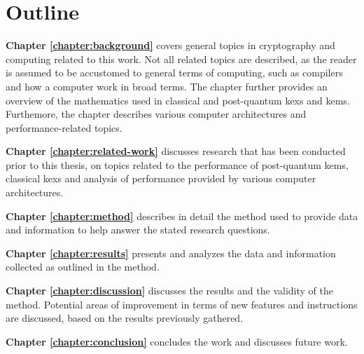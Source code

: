 \section{Outline}
\label{section:introduction:outline}

\begin{description}
    \item \textbf{Chapter \ref{chapter:background}} covers general topics in cryptography and computing related to this work. Not all related topics are described, as the reader is assumed to be accustomed to general terms of computing, such as compilers and how a computer work in broad terms. The chapter further provides an overview of the mathematics used in classical and \gls{post-quantum} \glspl{kex} and \glspl{kem}. Furthemore, the chapter describes various computer architectures and performance-related topics.

    \item \textbf{Chapter \ref{chapter:related-work}} discusses research that has been conducted prior to this thesis, on topics related to the performance of \gls{post-quantum} \glspl{kem}, classical \glspl{kex} and analysis of performance provided by various computer architectures.
    
    \item \textbf{Chapter \ref{chapter:method}} describes in detail the method used to provide data and information to help answer the stated research questions.
    
    \item \textbf{Chapter \ref{chapter:results}} presents and analyzes the data and information collected as outlined in the method.
    
    \item \textbf{Chapter \ref{chapter:discussion}} discusses the results and the validity of the method. Potential areas of improvement in terms of new features and instructions are discussed, based on the results previously gathered.
    
    \item \textbf{Chapter \ref{chapter:conclusion}} concludes the work and discusses future work.
\end{description}